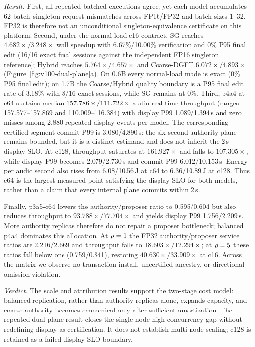 \emph{Result.} First, all repeated batched executions agree, yet each model
accumulates 62 batch--singleton request mismatches across FP16/FP32 and batch
sizes 1--32. FP32 is therefore not an unconditional singleton-equivalence
certificate on this platform. Second, under the normal-load c16 contract,
SG reaches $4.682\times/3.248\times$ wall speedup with 6.67\%/10.00\%
verification and 0\% P95 final edit (16/16 exact final sessions against the
independent FP16 singleton reference); Hybrid reaches
$5.764\times/4.657\times$ and Coarse-DGFT $6.072\times/4.893\times$
(Figure~\ref{fig:v100-dual-plane}a). On 0.6B every normal-load mode is exact (0\% P95
final edit); on 1.7B the Coarse/Hybrid quality boundary is a P95 final edit
rate of 3.18\% with 8/16 exact sessions, while SG remains at 0\%. Third, p4a4 at c64
sustains median $157.786\times/111.722\times$ audio real-time throughput
(ranges 157.577--157.869 and 110.009--116.384) with display P99
1.089/1.394\,s and zero misses among 2{,}880 repeated display events per model.
The corresponding certified-segment commit P99 is 3.080/4.890\,s: the
six-second authority plane remains bounded, but it is a distinct estimand and
does not inherit the 2\,s display SLO. At c128, throughput saturates at
$161.927\times$ and falls to $107.305\times$, while display P99 becomes
2.079/2.730\,s and commit P99 6.012/10.153\,s. Energy per audio second also
rises from 6.08/10.56\,J at c64 to 6.36/10.89\,J at c128. Thus c64 is the
largest measured point satisfying the display SLO for both models, rather
than a claim that every internal plane commits within 2\,s.

Finally, p3a5-c64 lowers the authority/proposer ratio to 0.595/0.604 but also
reduces throughput to $93.788\times/77.704\times$ and yields display P99
1.756/2.209\,s. More authority replicas therefore do not repair a proposer
bottleneck; balanced p4a4 dominates this allocation. At $\rho=1$ the
FP32 authority/proposer service ratios
are 2.216/2.669 and throughput falls to $18.603\times/12.294\times$; at
$\rho=5$ these ratios fall below one (0.759/0.841), restoring
$40.630\times/33.909\times$ at c16. Across the matrix we observe no
transaction-install, uncertified-ancestry, or directional-omission violation.

\emph{Verdict.} The scale and attribution results support the two-stage cost
model: balanced replication, rather than authority replicas alone, expands
capacity, and coarse authority becomes economical only after sufficient
amortization. The repeated dual-plane result closes the single-node
high-concurrency gap without redefining display as certification. It does not
establish multi-node scaling; c128 is retained as a failed display-SLO
boundary.

